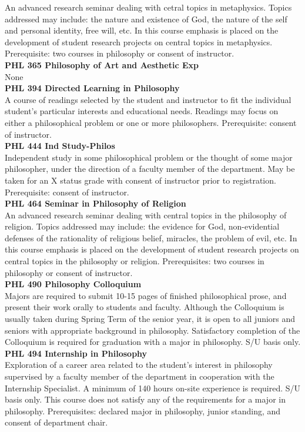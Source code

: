 \documentclass[
  letterpaper,
]{scrbook}
\begin{document}
An advanced research seminar dealing with cetral topics in metaphysics.
Topics addressed may include: the nature and existence of God, the
nature of the self and personal identity, free will, etc. In this course
emphasis is placed on the development of student research projects on
central topics in metaphysics. Prerequisite: two courses in philosophy
or consent of instructor.\\
\textbf{PHL 365 Philosophy of Art and Aesthetic Exp}\\
None\\
\textbf{PHL 394 Directed Learning in Philosophy}\\
A course of readings selected by the student and instructor to fit the
individual student's particular interests and educational needs.
Readings may focus on either a philosophical problem or one or more
philosophers. Prerequisite: consent of instructor.\\
\textbf{PHL 444 Ind Study-Philos}\\
Independent study in some philosophical problem or the thought of some
major philosopher, under the direction of a faculty member of the
department. May be taken for an X status grade with consent of
instructor prior to registration. Prerequisite: consent of instructor.\\
\textbf{PHL 464 Seminar in Philosophy of Religion}\\
An advanced research seminar dealing with central topics in the
philosophy of religion. Topics addressed may include: the evidence for
God, non-evidential defenses of the rationality of religious belief,
miracles, the problem of evil, etc. In this course emphasis is placed on
the development of student research projects on central topics in the
philosophy or religion. Prerequisites: two courses in philosophy or
consent of instructor.\\
\textbf{PHL 490 Philosophy Colloquium}\\
Majors are required to submit 10-15 pages of finished philosophical
prose, and present their work orally to students and faculty. Although
the Colloquium is usually taken during Spring Term of the senior year,
it is open to all juniors and seniors with appropriate background in
philosophy. Satisfactory completion of the Colloquium is required for
graduation with a major in philosophy. S/U basis only.\\
\textbf{PHL 494 Internship in Philosophy}\\
Exploration of a career area related to the student's interest in
philosophy supervised by a faculty member of the department in
cooperation with the Internship Specialist. A minimum of 140 hours
on-site experience is required. S/U basis only. This course does not
satisfy any of the requirements for a major in philosophy.
Prerequisites: declared major in philosophy, junior standing, and
consent of department chair.
\end{document}
